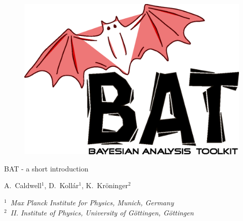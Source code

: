 \documentclass[11pt, a4paper]{article}
\begin{document}

\thispagestyle{empty}

\begin{figure}
\includegraphics[scale=0.25]{bat.eps}
\end{figure}

\vspace{1.0cm}

\begin{center}

{\Large {\sc BAT} - a short introduction}

\vspace{1.0cm}

{A.~Caldwell$^1$, D.~Koll\'ar$^1$, K.~Kr\"oninger$^2$}

\vspace{1.0cm}

{\it $^1$~Max Planck Institute for Physics, Munich, Germany \\
$^2$~II. Institute of Physics, University of G\"ottingen, G\"ottingen }
\end{center}

\thispagestyle{empty}

\pagebreak


\thispagestyle{empty}

\tableofcontents

\pagebreak

\end{document}
